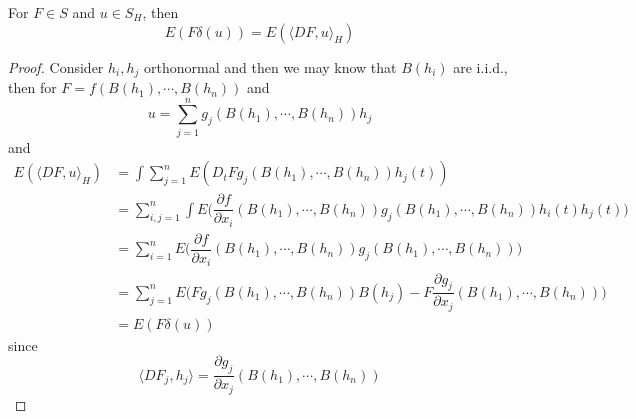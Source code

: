 \documentclass[lang=en, color=blue, ]{elegantbook}
\begin{document}
\begin{proposition}
    For $F\in S$ and $u\in S_H$, then
    \[
    E(F\delta(u)) = E(\langle DF,u\rangle_H)
    \]
\end{proposition}
\begin{proof}
    Consider $h_i,h_j$ orthonormal and then we may know that $B(h_i)$ are i.i.d., then for $F = f(B(h_1),\cdots,B(h_n))$ and
    \[
    u = \sum\limits_{j=1}^n g_j(B(h_1),\cdots,B(h_n))h_j
    \]
    and
    \[
    \begin{aligned}
    E(\langle DF,u\rangle_H) &= \int \sum\limits_{j=1}^n  E(D_tF g_j(B(h_1),\cdots,B(h_n))h_j(t)) \\
    & = \sum\limits_{i,j=1}^n \int E\Big(\dfrac{\partial f}{\partial x_i}(B(h_1),\cdots,B(h_n))g_j(B(h_1),\cdots,B(h_n)) h_i(t)h_j(t)\Big) \\
    &
    = \sum\limits_{i=1}^n E\Big(\dfrac{\partial f}{\partial x_i}(B(h_1),\cdots,B(h_n))g_j(B(h_1),\cdots,B(h_n))\Big) \\
    &= 
    \sum\limits_{j=1}^nE\Big(Fg_j(B(h_1),\cdots,B(h_n))B(h_j) - F\dfrac{\partial g_j}{\partial x_j}(B(h_1),\cdots,B(h_n))\Big) \\
    & = E(F\delta(u))
    \end{aligned}
    \]
    since
    \[
    \langle DF_j, h_j\rangle = \dfrac{\partial g_j}{\partial x_j}(B(h_1),\cdots,B(h_n))
    \]
\end{proof}
\end{document}
